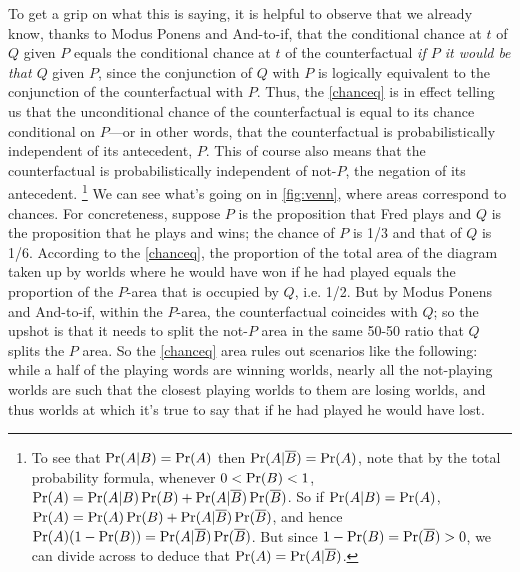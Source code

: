 \documentclass[If.tex]{subfiles}
\begin{document}
To get a grip on what this is saying, it is helpful to observe that we already know, thanks to Modus Ponens and And-to-if, that the conditional chance at $t$ of $Q$ given $P$ equals the conditional chance at $t$ of the counterfactual \emph{if $P$ it would be that $Q$} given $P$, since the conjunction of $Q$ with $P$ is logically equivalent to the conjunction of the counterfactual with $P$.  Thus, the \ref{chanceq} is in effect telling us that the unconditional chance of the counterfactual is equal to its chance conditional on $P$---or in other words, that the counterfactual is probabilistically independent of its antecedent, $P$.  This of course also means that the counterfactual is probabilistically independent of not-$P$, the negation of its antecedent.%
\footnote{To see that $\operatorname{Pr}(A|B) = \operatorname{Pr}(A)$ then $\operatorname{Pr}(A|\overline{B}) = \operatorname{Pr}(A)$, note that by the total probability formula, whenever $0 < \operatorname{Pr}(B) < 1$, 
	$
		\operatorname{Pr}(A) = \operatorname{Pr}(A|B)\operatorname{Pr}(B) + \operatorname{Pr}(A|\overline{B})\operatorname{Pr}(\overline{B})
	$.
	So if $\operatorname{Pr}(A|B) = \operatorname{Pr}(A)$,
	$
		\operatorname{Pr}(A) = \operatorname{Pr}(A)\operatorname{Pr}(B) + \operatorname{Pr}(A|\overline{B})\operatorname{Pr}(\overline{B})
	$, and hence 
		$\operatorname{Pr}(A)(1 - \operatorname{Pr}(B)) = \operatorname{Pr}(A|\overline{B})\operatorname{Pr}(\overline{B})$.
	But since $1-\operatorname{Pr}(B) = \operatorname{Pr}(\overline{B}) > 0$, we can divide across to deduce that
	$\operatorname{Pr}(A) = \operatorname{Pr}(A|\overline{B})$.}
We can see what's going on in \autoref{fig:venn}, where areas correspond to chances.  For concreteness, suppose $P$ is the proposition that Fred plays and $Q$ is the proposition that he plays and wins; the chance of $P$ is 1/3 and that of $Q$ is 1/6.  According to the \ref{chanceq}, the proportion of the total area of the diagram taken up by worlds where he would have won if he had played equals the proportion of the $P$-area that is occupied by $Q$, i.e. 1/2.  But by Modus Ponens and And-to-if, within the $P$-area, the counterfactual coincides with $Q$; so the upshot is that it needs to split the not-$P$ area in the same 50-50 ratio that $Q$ splits the $P$ area.  So the \ref{chanceq} area rules out scenarios like the following: while a half of the playing words are winning worlds, nearly all the not-playing worlds are such that the closest playing worlds to them are losing worlds, and thus worlds at which it's true to say that if he had played he would have lost.  
\end{document}
